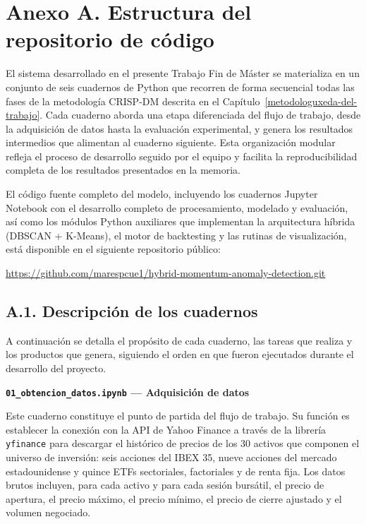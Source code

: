 \newpage
\section*{Anexo A. Estructura del repositorio de código}
\hypertarget{anex:codigo}{}
\label{anex:codigo}

El sistema desarrollado en el presente Trabajo Fin de Máster se materializa en un conjunto de seis cuadernos de Python que recorren de forma secuencial todas las fases de la metodología CRISP-DM descrita en el Capítulo~\ref{metodologuxeda-del-trabajo}. Cada cuaderno aborda una etapa diferenciada del flujo de trabajo, desde la adquisición de datos hasta la evaluación experimental, y genera los resultados intermedios que alimentan al cuaderno siguiente. Esta organización modular refleja el proceso de desarrollo seguido por el equipo y facilita la reproducibilidad completa de los resultados presentados en la memoria.

El código fuente completo del modelo, incluyendo los cuadernos Jupyter Notebook con el desarrollo completo de procesamiento, modelado y evaluación, así como los módulos Python auxiliares que implementan la arquitectura híbrida (DBSCAN + K-Means), el motor de backtesting y las rutinas de visualización, está disponible en el siguiente repositorio público:

\vspace{0.3cm}
\centerline{\url{https://github.com/marespcue1/hybrid-momentum-anomaly-detection.git}}
\vspace{0.3cm}

\subsection*{A.1. Descripción de los cuadernos}

A continuación se detalla el propósito de cada cuaderno, las tareas que realiza y los productos que genera, siguiendo el orden en que fueron ejecutados durante el desarrollo del proyecto.

\textbf{\texttt{01\_obtencion\_datos.ipynb} --- Adquisición de datos}

Este cuaderno constituye el punto de partida del flujo de trabajo. Su función es establecer la conexión con la API de Yahoo Finance a través de la librería \texttt{yfinance} para descargar el histórico de precios de los 30 activos que componen el universo de inversión: seis acciones del IBEX 35, nueve acciones del mercado estadounidense y quince ETFs sectoriales, factoriales y de renta fija. Los datos brutos incluyen, para cada activo y para cada sesión bursátil, el precio de apertura, el precio máximo, el precio mínimo, el precio de cierre ajustado y el volumen negociado.

